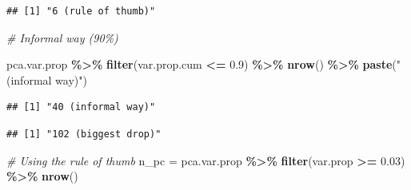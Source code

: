 \documentclass[
]{article}
\newenvironment{Shaded}{\begin{snugshade}}{\end{snugshade}}
\newcommand{\CommentTok}[1]{\textcolor[rgb]{0.56,0.35,0.01}{\textit{#1}}}
\newcommand{\DecValTok}[1]{\textcolor[rgb]{0.00,0.00,0.81}{#1}}
\newcommand{\FloatTok}[1]{\textcolor[rgb]{0.00,0.00,0.81}{#1}}
\newcommand{\FunctionTok}[1]{\textcolor[rgb]{0.13,0.29,0.53}{\textbf{#1}}}
\newcommand{\NormalTok}[1]{#1}
\newcommand{\OtherTok}[1]{\textcolor[rgb]{0.56,0.35,0.01}{#1}}
\newcommand{\SpecialCharTok}[1]{\textcolor[rgb]{0.81,0.36,0.00}{\textbf{#1}}}
\newcommand{\StringTok}[1]{\textcolor[rgb]{0.31,0.60,0.02}{#1}}
\begin{document}
\begin{verbatim}
## [1] "6 (rule of thumb)"
\end{verbatim}

\begin{Shaded}
\begin{Highlighting}[]
\CommentTok{\# Informal way (90\%)}

\NormalTok{pca.var.prop }\SpecialCharTok{\%\textgreater{}\%}
    \FunctionTok{filter}\NormalTok{(var.prop.cum }\SpecialCharTok{\textless{}=} \FloatTok{0.9}\NormalTok{) }\SpecialCharTok{\%\textgreater{}\%}
    \FunctionTok{nrow}\NormalTok{() }\SpecialCharTok{\%\textgreater{}\%}
    \FunctionTok{paste}\NormalTok{(}\StringTok{"(informal way)"}\NormalTok{)}
\end{Highlighting}
\end{Shaded}

\begin{verbatim}
## [1] "40 (informal way)"
\end{verbatim}

\begin{Shaded}
\end{Shaded}

\begin{verbatim}
## [1] "102 (biggest drop)"
\end{verbatim}

\begin{Shaded}
\begin{Highlighting}[]
\CommentTok{\# Using the rule of thumb}
\NormalTok{n\_pc }\OtherTok{=}\NormalTok{ pca.var.prop }\SpecialCharTok{\%\textgreater{}\%}
    \FunctionTok{filter}\NormalTok{(var.prop }\SpecialCharTok{\textgreater{}=} \FloatTok{0.03}\NormalTok{) }\SpecialCharTok{\%\textgreater{}\%}
    \FunctionTok{nrow}\NormalTok{()}
\end{Highlighting}
\end{Shaded}
\end{document}

